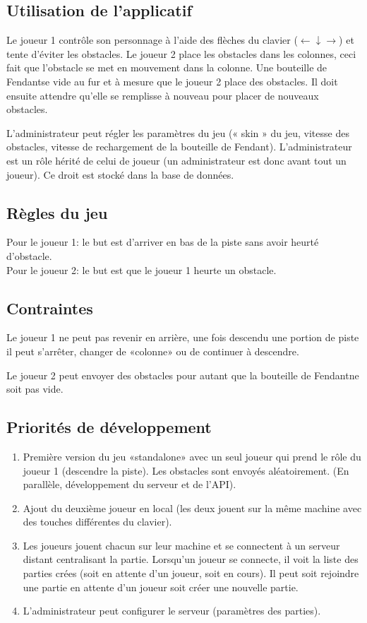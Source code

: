 \documentclass[a4paper,11pt]{article}
\begin{document}
	
	\subsection{Utilisation de l'applicatif}
	Le joueur 1 contrôle son personnage à l'aide des flèches du clavier ($\leftarrow \downarrow \rightarrow$) et tente d'éviter les obstacles. Le joueur 2 place les obstacles dans les colonnes, ceci fait que l'obstacle se met en mouvement dans la colonne. Une bouteille de Fendant\texttrademark se vide au fur et à mesure que le joueur 2 place des obstacles. Il doit ensuite attendre qu'elle se remplisse à nouveau pour placer de nouveaux obstacles.\par
	
	L'administrateur peut régler les paramètres du jeu (« skin » du jeu, vitesse des obstacles, vitesse de rechargement de la bouteille de Fendant\texttrademark). L'administrateur est un rôle hérité de celui de joueur (un administrateur est donc avant tout un joueur). Ce droit est stocké dans la base de données.
	
	
	\subsection{Règles du jeu}
	Pour le joueur 1: le but est d'arriver en bas de la piste sans avoir heurté d'obstacle. \\
	Pour le joueur 2: le but est que le joueur 1 heurte un obstacle.
	
	
	\subsection{Contraintes}
	Le joueur 1 ne peut pas revenir en arrière, une fois descendu une portion de piste il peut s'arrêter, changer de «colonne» ou de continuer à descendre. \par
	
	Le joueur 2 peut envoyer des obstacles pour autant que la bouteille de Fendant\texttrademark ne soit pas vide.
	
	
	\subsection{Priorités de développement}
	\begin{enumerate}
		\item Première version du jeu «standalone» avec un seul joueur qui prend le rôle du joueur 1 (descendre la piste). Les obstacles sont envoyés aléatoirement. (En parallèle, développement du serveur et de l'API).
		\item Ajout du deuxième joueur en local (les deux jouent sur la même machine avec des touches différentes du clavier).
		\item Les joueurs jouent chacun sur leur machine et se connectent à un serveur distant centralisant la partie. Lorsqu'un joueur se connecte, il voit la liste des parties crées (soit en attente d'un joueur, soit en cours). Il peut soit rejoindre une partie en attente d'un joueur soit créer une nouvelle partie.
		\item L'administrateur peut configurer le serveur (paramètres des parties).
	\end{enumerate}
	
\end{document}
